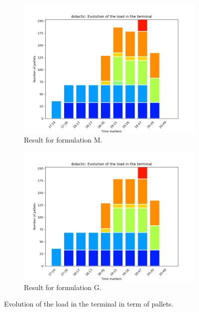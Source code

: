 \documentclass[preprint,12pt,authoryear]{elsarticle}
\begin{document}
 
 

\begin{figure}[t!]
%
\begin{minipage}[c]{0.5\linewidth}
   \begin{subfigure}[t]{0.95\textwidth}
       \centering
      \includegraphics[scale=0.35]{images/didacLoadFormulationM.png}
      \caption{Result for formulation M.}
      \label{fig:didacLoadFormulationM}
    \end{subfigure}
\end{minipage} 
%
\hfill
%
\begin{minipage}[c]{0.5\linewidth}
    \begin{subfigure}[t]{0.95\textwidth}
        \centering
      \includegraphics[scale=0.35]{images/didacLoadFormulationG.png}
      \caption{Result for formulation G.}
      \label{fig:didacLoadFormulationG}
    \end{subfigure}
\end{minipage}
%
  \caption{Evolution of the load in the terminal in term of pallets.}
   \label{fig:didacLoadMG}
\end{figure}
\end{document}
